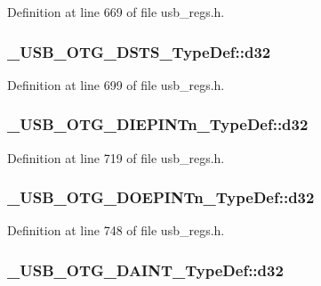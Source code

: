 Definition at line 669 of file usb\-\_\-regs.\-h.

\hypertarget{group___u_s_b___o_t_g___d_r_i_v_e_r_ga737954fcf78fc0cf776ed36505e4b082}{
\subsubsection[{d32}]{ \-\_\-\-U\-S\-B\-\_\-\-O\-T\-G\-\_\-\-D\-S\-T\-S\-\_\-\-Type\-Def\-::d32}}\label{group___u_s_b___o_t_g___d_r_i_v_e_r_ga737954fcf78fc0cf776ed36505e4b082}


Definition at line 699 of file usb\-\_\-regs.\-h.

\hypertarget{group___u_s_b___o_t_g___d_r_i_v_e_r_ga99c655451b8e7c36e5cffe80238d8def}{
\subsubsection[{d32}]{ \-\_\-\-U\-S\-B\-\_\-\-O\-T\-G\-\_\-\-D\-I\-E\-P\-I\-N\-Tn\-\_\-\-Type\-Def\-::d32}}\label{group___u_s_b___o_t_g___d_r_i_v_e_r_ga99c655451b8e7c36e5cffe80238d8def}


Definition at line 719 of file usb\-\_\-regs.\-h.

\hypertarget{group___u_s_b___o_t_g___d_r_i_v_e_r_ga6a2af3648bfb97391f2a267df8bd3204}{
\subsubsection[{d32}]{ \-\_\-\-U\-S\-B\-\_\-\-O\-T\-G\-\_\-\-D\-O\-E\-P\-I\-N\-Tn\-\_\-\-Type\-Def\-::d32}}\label{group___u_s_b___o_t_g___d_r_i_v_e_r_ga6a2af3648bfb97391f2a267df8bd3204}


Definition at line 748 of file usb\-\_\-regs.\-h.

\hypertarget{group___u_s_b___o_t_g___d_r_i_v_e_r_gad342406e081a08b2f1ef61a8144b732e}{
\subsubsection[{d32}]{ \-\_\-\-U\-S\-B\-\_\-\-O\-T\-G\-\_\-\-D\-A\-I\-N\-T\-\_\-\-Type\-Def\-::d32}}\label{group___u_s_b___o_t_g___d_r_i_v_e_r_gad342406e081a08b2f1ef61a8144b732e}


